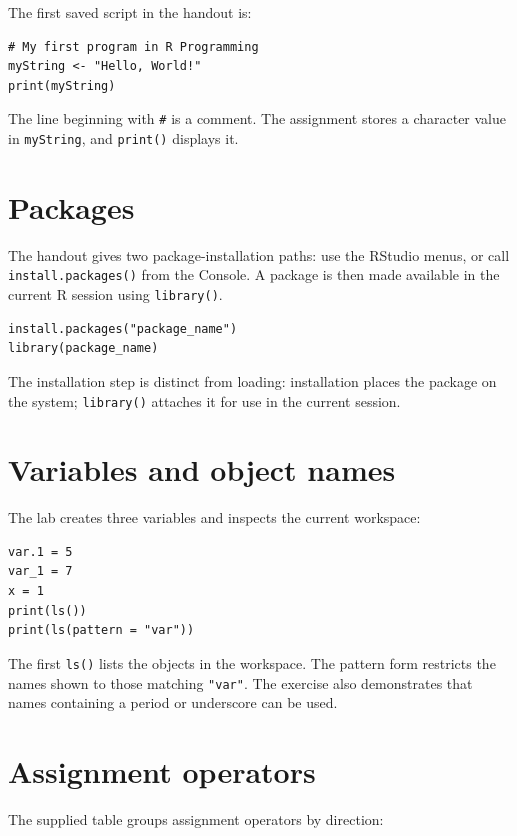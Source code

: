 \begin{workedexample}
The first saved script in the handout is:
\begin{lstlisting}[style=dsr]
# My first program in R Programming
myString <- "Hello, World!"
print(myString)
\end{lstlisting}
The line beginning with \texttt{\#} is a comment. The assignment stores a character value in \texttt{myString}, and \texttt{print()} displays it.
\end{workedexample}

\section{Packages}

The handout gives two package-installation paths: use the RStudio menus, or call \texttt{install.packages()} from the Console. A package is then made available in the current R session using \texttt{library()}.

\begin{lstlisting}[style=dsr]
install.packages("package_name")
library(package_name)
\end{lstlisting}

The installation step is distinct from loading: installation places the package on the system; \texttt{library()} attaches it for use in the current session.

\section{Variables and object names}

The lab creates three variables and inspects the current workspace:

\begin{lstlisting}[style=dsr]
var.1 = 5
var_1 = 7
x = 1
print(ls())
print(ls(pattern = "var"))
\end{lstlisting}

The first \texttt{ls()} lists the objects in the workspace. The pattern form restricts the names shown to those matching \texttt{"var"}. The exercise also demonstrates that names containing a period or underscore can be used.

\section{Assignment operators}

The supplied table groups assignment operators by direction:

